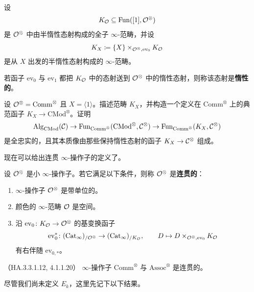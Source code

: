 \begin{definition}\label{L23-2.5}
设
\[
K_{\mathcal{O}}\subseteq\operatorname{Fun}([1],\mathcal{O}^{\otimes})
\]
是 $\mathcal{O}^{\otimes}$ 中由半惰性态射构成的全子 $\infty$-范畴，并设
\[
K_{X}\coloneqq\{X\}\times_{\mathcal{O}^{\otimes},\mathrm{ev}_{0}}K_{\mathcal{O}}
\]
是从 $X$ 出发的半惰性态射构成的 $\infty$-范畴。
\end{definition}

\begin{definition}\label{L23-2.6}
若函子 $\mathrm{ev}_{0}$ 与 $\mathrm{ev}_{1}$ 都把 $K_{\mathcal{O}}$ 中的态射送到 $\mathcal{O}^{\otimes}$ 中的惰性态射，则称该态射是\textbf{惰性的}。
\end{definition}

\begin{exercise}\label{L23-2.7}
设 $\mathcal{O}^{\otimes}=\mathrm{Comm}^{\otimes}$ 且 $X=\langle1\rangle$。描述范畴 $K_{X}$，并构造一个定义在 $\mathrm{Comm}^{\otimes}$ 上的典范函子 $K_{X}\to\mathrm{CMod}^{\otimes}$。证明
\[
\operatorname{Alg}_{\mathrm{CMod}}(\mathcal{C})\to\operatorname{Fun}_{\mathrm{Comm}^{\otimes}}(\mathrm{CMod}^{\otimes},\mathcal{C}^{\otimes})\to\operatorname{Fun}_{\mathrm{Comm}^{\otimes}}(K_{X},\mathcal{C}^{\otimes})
\]
是全忠实的，且其本质像由那些保持惰性态射的函子 $K_{X}\to\mathcal{C}^{\otimes}$ 组成。
\end{exercise}

\nitem\label{L23-2.8} 现在可以给出连贯 $\infty$-操作子的定义了。

\begin{definition}\label{L23-2.9}
设 $\mathcal{O}^{\otimes}$ 是小 $\infty$-操作子。若它满足以下条件，则称 $\mathcal{O}^{\otimes}$ 是\textbf{连贯的}：
\begin{enumerate}[label=(\roman*),leftmargin=2.4em,itemsep=0.1em]
\item $\infty$-操作子 $\mathcal{O}^{\otimes}$ 是带单位的。
\item 颜色的 $\infty$-范畴 $\mathcal{O}$ 是空间。
\item 沿 $\mathrm{ev}_{0}\colon K_{\mathcal{O}}\to\mathcal{O}^{\otimes}$ 的基变换函子
\[
\mathrm{ev}_{0}^{*}\colon(\operatorname{Cat}_{\infty})_{/\mathcal{O}^{\otimes}}\to(\operatorname{Cat}_{\infty})_{/K_{\mathcal{O}}},\qquad
D\mapsto D\times_{\mathcal{O}^{\otimes},\mathrm{ev}_{0}}K_{\mathcal{O}}
\]
有右伴随 $\mathrm{ev}_{0,*}$。
\end{enumerate}
\end{definition}

\begin{proposition}\label{L23-2.10}（HA.3.3.1.12, 4.1.1.20）
$\infty$-操作子 $\mathrm{Comm}^{\otimes}$ 与 $\mathrm{Assoc}^{\otimes}$ 是连贯的。
\end{proposition}

\nitem\label{L23-2.11} 尽管我们尚未定义 $E_{k}$，这里先记下以下结果。

